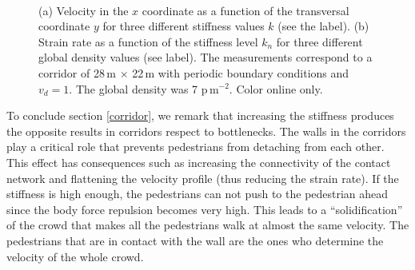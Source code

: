 \documentclass[preprint,12pt]{elsarticle}
\begin{document}
\begin{figure}[!htbp]
\centering
    \ 
    \\
\caption[width=0.47\columnwidth]{(a) Velocity in the $x$ coordinate as a function of the transversal coordinate $y$ for three different stiffness values $k$ (see the label). (b) Strain rate as a function of the stiffness level $k_n$ for three different global density values (see label). The measurements correspond to a corridor of 28$\,$m $\times$ 22$\,$m with periodic boundary conditions and $v_d=1$. The global density was 7 p$\,$m$^{-2}$. Color online only. }
\label{profile_strain}
\end{figure}


To conclude section \ref{corridor}, we remark that increasing the stiffness produces the opposite results in corridors respect to bottlenecks. The walls in the corridors play a critical role that prevents pedestrians from detaching from each other. This effect has consequences such as increasing the connectivity of the contact network and flattening the velocity profile (thus reducing the strain rate). If the stiffness is high enough, the pedestrians can not push to the pedestrian ahead since the body force repulsion becomes very high. This leads to a ``solidification'' of the crowd that makes all the pedestrians walk at almost the same velocity. The pedestrians that are in contact with the wall are the ones who determine the velocity of the whole crowd. \\
\end{document}
